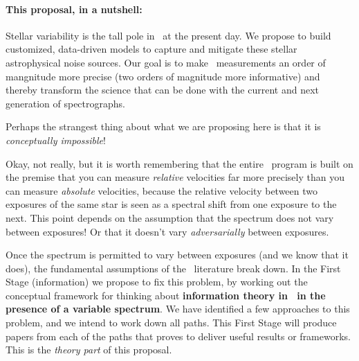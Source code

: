 \documentclass[12pt, letterpaper]{article}
\begin{document}
\paragraph{This proposal, in a nutshell:}
Stellar variability is the tall pole in \EPRV\ at the present day.
We propose to build customized, data-driven models to capture and mitigate these
stellar astrophysical noise sources.
Our goal is to make \EPRV\ measurements an order of mangnitude more precise
(two orders of magnitude more informative) and thereby transform the science
that can be done with the current and next generation of spectrographs.


Perhaps the strangest thing about what we are proposing here is that
it is \emph{conceptually impossible}!

Okay, not really, but it is worth remembering that the entire
\EPRV\ program is built on the premise that you can measure
\emph{relative} velocities far more precisely than you can measure
\emph{absolute} velocities, because the relative velocity between two
exposures of the same star is seen as a spectral shift from one
exposure to the next.
This point depends on the assumption that the spectrum does not vary
between exposures!
Or that it doesn't vary \emph{adversarially} between exposures.

Once the spectrum is permitted to vary between exposures (and we know that
it does), the fundamental assumptions of the \EPRV\ literature break down.
In the First Stage (information) we propose to fix this problem, by
working out the conceptual framework for thinking about
\textbf{information theory in \EPRV\ in the presence of a variable
  spectrum}.
We have identified a few approaches to this problem, and we intend to
work down all paths.
This First Stage will produce papers from each of the paths that proves
to deliver useful results or frameworks.
This is the \emph{theory part} of this proposal.
\end{document}
